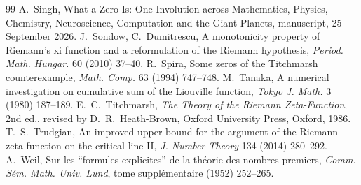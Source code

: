 \documentclass[11pt]{article}
\theoremstyle{definition}\newtheorem{definition}[theorem]{Definition}
\theoremstyle{remark}\newtheorem{remark}[theorem]{Remark}
\begin{document}
\begin{thebibliography}{99}
 A.~Singh, What a Zero Is: One Involution across Mathematics, Physics, Chemistry, Neuroscience, Computation and the Giant Planets, manuscript, 25 September 2026.
 J.~Sondow, C.~Dumitrescu, A monotonicity property of Riemann's xi function and a reformulation of the Riemann hypothesis, \emph{Period. Math. Hungar.} 60 (2010) 37--40.
 R.~Spira, Some zeros of the Titchmarsh counterexample, \emph{Math. Comp.} 63 (1994) 747--748.
 M.~Tanaka, A numerical investigation on cumulative sum of the Liouville function, \emph{Tokyo J. Math.} 3 (1980) 187--189.
 E.~C.~Titchmarsh, \emph{The Theory of the Riemann Zeta-Function}, 2nd ed., revised by D.~R.~Heath-Brown, Oxford University Press, Oxford, 1986.
 T.~S.~Trudgian, An improved upper bound for the argument of the Riemann zeta-function on the critical line II, \emph{J. Number Theory} 134 (2014) 280--292.
 A.~Weil, Sur les ``formules explicites'' de la th\'eorie des nombres premiers, \emph{Comm. S\'em. Math. Univ. Lund}, tome suppl\'ementaire (1952) 252--265.
\end{thebibliography}
\end{document}
